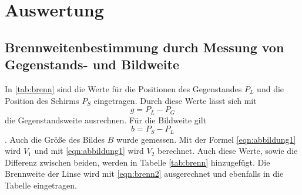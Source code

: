 \section{Auswertung}
\label{sec:Auswertung}

\subsection{Brennweitenbestimmung durch Messung von Gegenstands- und Bildweite}

In \ref{tab:brenn} sind die Werte für die Positionen des Gegenstandes $P_L$ und die Position des Schirms $P_S$ eingetragen.
Durch diese Werte lässt sich mit
\begin{equation}
  g=P_L-P_G
\end{equation}
die Gegenstandsweite ausrechnen.
Für die Bildweite gilt
\begin{equation}
  b=P_S-P_L
\end{equation}.
Auch die Größe des Bildes $B$ wurde gemessen.
Mit der Formel \ref{eqn:abbildung1} wird $V_1$ und mit \ref{eqn:abbildung1} wird $V_2$ berechnet.
Auch diese Werte, sowie die Differenz zwischen beiden, werden in Tabelle \ref{tab:brenn} hinzugefügt.
Die Brennweite der Linse wird mit \ref{eqn:brenn2} ausgerechnet und ebenfalls in die Tabelle eingetragen.


